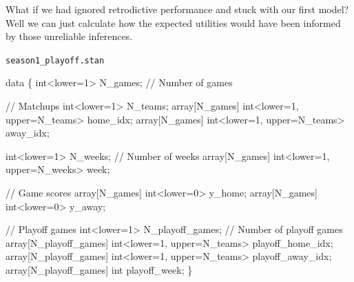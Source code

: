\documentclass[
  letterpaper,
  DIV=11,
  numbers=noendperiod]{scrartcl}
\newenvironment{Shaded}{\begin{snugshade}}{\end{snugshade}}
\newcommand{\CommentTok}[1]{\textcolor[rgb]{0.37,0.37,0.37}{#1}}
\newcommand{\DataTypeTok}[1]{\textcolor[rgb]{0.68,0.00,0.00}{#1}}
\newcommand{\DecValTok}[1]{\textcolor[rgb]{0.68,0.00,0.00}{#1}}
\newcommand{\KeywordTok}[1]{\textcolor[rgb]{0.00,0.23,0.31}{#1}}
\newcommand{\NormalTok}[1]{\textcolor[rgb]{0.00,0.23,0.31}{#1}}
\begin{document}
What if we had ignored retrodictive performance and stuck with our first
model? Well we can just calculate how the expected utilities would have
been informed by those unreliable inferences.

\begin{codelisting}

\caption{\texttt{season1\_playoff.stan}}

\begin{Shaded}
\begin{Highlighting}[]
\KeywordTok{data}\NormalTok{ \{}
  \DataTypeTok{int}\NormalTok{\textless{}}\KeywordTok{lower}\NormalTok{=}\DecValTok{1}\NormalTok{\textgreater{} N\_games; }\CommentTok{// Number of games}

  \CommentTok{// Matchups}
  \DataTypeTok{int}\NormalTok{\textless{}}\KeywordTok{lower}\NormalTok{=}\DecValTok{1}\NormalTok{\textgreater{} N\_teams;}
  \DataTypeTok{array}\NormalTok{[N\_games] }\DataTypeTok{int}\NormalTok{\textless{}}\KeywordTok{lower}\NormalTok{=}\DecValTok{1}\NormalTok{, }\KeywordTok{upper}\NormalTok{=N\_teams\textgreater{} home\_idx;}
  \DataTypeTok{array}\NormalTok{[N\_games] }\DataTypeTok{int}\NormalTok{\textless{}}\KeywordTok{lower}\NormalTok{=}\DecValTok{1}\NormalTok{, }\KeywordTok{upper}\NormalTok{=N\_teams\textgreater{} away\_idx;}

  \DataTypeTok{int}\NormalTok{\textless{}}\KeywordTok{lower}\NormalTok{=}\DecValTok{1}\NormalTok{\textgreater{} N\_weeks; }\CommentTok{// Number of weeks}
  \DataTypeTok{array}\NormalTok{[N\_games] }\DataTypeTok{int}\NormalTok{\textless{}}\KeywordTok{lower}\NormalTok{=}\DecValTok{1}\NormalTok{, }\KeywordTok{upper}\NormalTok{=N\_weeks\textgreater{} week;}

  \CommentTok{// Game scores}
  \DataTypeTok{array}\NormalTok{[N\_games] }\DataTypeTok{int}\NormalTok{\textless{}}\KeywordTok{lower}\NormalTok{=}\DecValTok{0}\NormalTok{\textgreater{} y\_home;}
  \DataTypeTok{array}\NormalTok{[N\_games] }\DataTypeTok{int}\NormalTok{\textless{}}\KeywordTok{lower}\NormalTok{=}\DecValTok{0}\NormalTok{\textgreater{} y\_away;}

  \CommentTok{// Playoff games}
  \DataTypeTok{int}\NormalTok{\textless{}}\KeywordTok{lower}\NormalTok{=}\DecValTok{1}\NormalTok{\textgreater{} N\_playoff\_games; }\CommentTok{// Number of playoff games}
  \DataTypeTok{array}\NormalTok{[N\_playoff\_games] }\DataTypeTok{int}\NormalTok{\textless{}}\KeywordTok{lower}\NormalTok{=}\DecValTok{1}\NormalTok{, }\KeywordTok{upper}\NormalTok{=N\_teams\textgreater{} playoff\_home\_idx;}
  \DataTypeTok{array}\NormalTok{[N\_playoff\_games] }\DataTypeTok{int}\NormalTok{\textless{}}\KeywordTok{lower}\NormalTok{=}\DecValTok{1}\NormalTok{, }\KeywordTok{upper}\NormalTok{=N\_teams\textgreater{} playoff\_away\_idx;}
  \DataTypeTok{array}\NormalTok{[N\_playoff\_games] }\DataTypeTok{int}\NormalTok{ playoff\_week;}
\NormalTok{\}}


\end{Highlighting}
\end{Shaded}
\end{codelisting}
\end{document}
